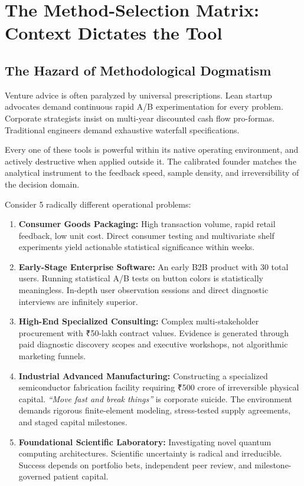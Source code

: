 \section{The Method-Selection Matrix: Context Dictates the Tool}

\subsection{The Hazard of Methodological Dogmatism}

Venture advice is often paralyzed by universal prescriptions. Lean startup advocates demand continuous rapid A/B experimentation for every problem. Corporate strategists insist on multi-year discounted cash flow pro-formas. Traditional engineers demand exhaustive waterfall specifications.

Every one of these tools is powerful within its native operating environment, and actively destructive when applied outside it. The calibrated founder matches the analytical instrument to the feedback speed, sample density, and irreversibility of the decision domain.

Consider 5 radically different operational problems:
\begin{enumerate}[leftmargin=12pt,itemsep=2pt,topsep=1pt,parsep=0pt]
  \item \textbf{Consumer Goods Packaging:} High transaction volume, rapid retail feedback, low unit cost. Direct consumer testing and multivariate shelf experiments yield actionable statistical significance within weeks.
  \item \textbf{Early-Stage Enterprise Software:} An early B2B product with 30 total users. Running statistical A/B tests on button colors is statistically meaningless. In-depth user observation sessions and direct diagnostic interviews are infinitely superior.
  \item \textbf{High-End Specialized Consulting:} Complex multi-stakeholder procurement with ₹50-lakh contract values. Evidence is generated through paid diagnostic discovery scopes and executive workshops, not algorithmic marketing funnels.
  \item \textbf{Industrial Advanced Manufacturing:} Constructing a specialized semiconductor fabrication facility requiring ₹500 crore of irreversible physical capital. \textit{``Move fast and break things''} is corporate suicide. The environment demands rigorous finite-element modeling, stress-tested supply agreements, and staged capital milestones.
  \item \textbf{Foundational Scientific Laboratory:} Investigating novel quantum computing architectures. Scientific uncertainty is radical and irreducible. Success depends on portfolio bets, independent peer review, and milestone-governed patient capital.
\end{enumerate}

